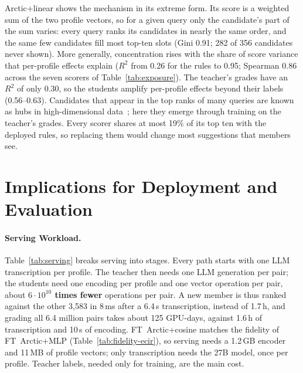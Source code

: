 \documentclass[runningheads,a4paper]{llncs}
\newcommand{\model}[1]{{\hyphenpenalty=10000 \exhyphenpenalty=10000 \textsf{#1}}}
\begin{document}
\model{Arctic+linear} shows the mechanism in its extreme form. Its score is a
weighted sum of the two profile vectors, so for a given query only the candidate's
part of the sum varies: every query ranks its candidates in nearly the same order,
and the same few candidates fill most top-ten slots (Gini 0.91; 282 of 356
candidates never shown). More generally, concentration
rises with the share of score variance that per-profile effects explain ($R^2$
from 0.26 for the rules to 0.95; Spearman 0.86 across the seven
scorers of Table~\ref{tab:exposure}). The teacher's grades have an $R^2$ of only 0.30, so
the students amplify per-profile effects beyond their labels (0.56--0.63).
Candidates that appear in the top ranks of many queries are known as hubs in
high-dimensional data~\cite{radovanovic2010hubs}; here they
emerge through training on the teacher's grades.
Every scorer shares at most 19\% of its top ten with the deployed rules, so
replacing them would change most suggestions that members see.

\section{Implications for Deployment and Evaluation}
\paragraph{Serving Workload.}
Table~\ref{tab:serving} breaks serving into stages. Every path starts with one LLM
transcription per profile. The teacher then needs one LLM generation per pair;
the students need one encoding per profile and one vector operation per pair,
about \textbf{{\boldmath$6\cdot10^{10}$} times fewer} operations per pair. A new member is thus ranked
against the other 3,583 in 8\,ms after a 6.4\,s transcription, instead of 1.7\,h,
and grading all 6.4 million pairs takes about 125 GPU-days, against 1.6\,h of
transcription and 10\,s of encoding. \model{FT~Arctic+cosine} matches the fidelity of \model{FT~Arctic+MLP}
(Table~\ref{tab:fidelity-ecir}), so serving needs a 1.2\,GB encoder and 11\,MB of
profile vectors; only transcription needs the 27B model, once per profile. Teacher labels,
needed only for training, are the main cost.
\end{document}
